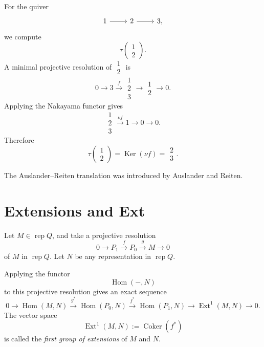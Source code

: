 \documentclass[11pt, a4paper]{report}
\begin{document}
\begin{example}
For the quiver
\[
\begin{tikzcd}
1 \arrow[r] & 2 \arrow[r] & 3 ,
\end{tikzcd}
\]
we compute
\[
\tau\left(\substack{1\\2}\right).
\]
A minimal projective resolution of \(\substack{1\\2}\) is
\[
0
\longrightarrow
3
\xrightarrow{f}
\substack{1\\2\\3}
\longrightarrow
\substack{1\\2}
\longrightarrow
0.
\]
Applying the Nakayama functor gives
\[
\substack{1\\2\\3}
\xrightarrow{\nu f}
1
\longrightarrow
0
\longrightarrow
0.
\]
Therefore
\[
\tau\left(\substack{1\\2}\right)
=
\operatorname{Ker}(\nu f)
=
\substack{2\\3}.
\]
\end{example}

\begin{remark}
The Auslander--Reiten translation was introduced by Auslander and Reiten.
\end{remark}

\section{Extensions and Ext}

\begin{definition}
Let \(M\in \operatorname{rep} Q\), and take a projective resolution
\[
0
\longrightarrow
P_1
\xrightarrow{f}
P_0
\xrightarrow{g}
M
\longrightarrow
0
\]
of \(M\) in \(\operatorname{rep} Q\). Let \(N\) be any representation in
\(\operatorname{rep} Q\).

Applying the functor
\[
\operatorname{Hom}(-,N)
\]
to this projective resolution gives an exact sequence
\[
0
\longrightarrow
\operatorname{Hom}(M,N)
\xrightarrow{g^\ast}
\operatorname{Hom}(P_0,N)
\xrightarrow{f^\ast}
\operatorname{Hom}(P_1,N)
\longrightarrow
\operatorname{Ext}^1(M,N)
\longrightarrow
0.
\]
The vector space
\[
\operatorname{Ext}^1(M,N)
:=
\operatorname{Coker}(f^\ast)
\]
is called the \emph{first group of extensions} of \(M\) and \(N\).
\end{definition}
\end{document}
